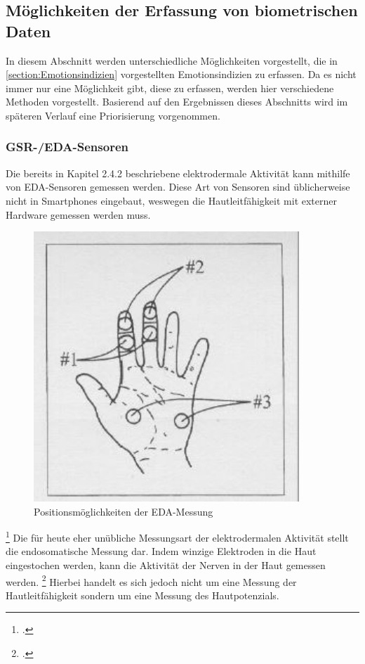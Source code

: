 \subsection{Möglichkeiten der Erfassung von biometrischen Daten} 
In diesem Abschnitt werden unterschiedliche Möglichkeiten vorgestellt, die in \ref{section:Emotionsindizien} vorgestellten Emotionsindizien zu erfassen. Da es nicht immer nur eine Möglichkeit gibt, diese zu erfassen, werden hier verschiedene Methoden vorgestellt. Basierend auf den Ergebnissen dieses Abschnitts wird im späteren Verlauf eine Priorisierung vorgenommen.  
\subsubsection{GSR-/EDA-Sensoren}
Die bereits in Kapitel 2.4.2 beschriebene elektrodermale Aktivität kann mithilfe von EDA-Sensoren gemessen werden. Diese Art von Sensoren sind üblicherweise nicht in Smartphones eingebaut, weswegen die Hautleitfähigkeit mit externer Hardware gemessen werden muss. \newline
\begin{figure}[h]
	\centering
	\includegraphics[width=10cm]{Bilder/gsr-hand.jpg}
	\caption[Positionsmöglichkeiten der EDA-Messung]{Positionsmöglichkeiten der EDA-Messung\footnotemark}
\end{figure}\footcitetext[][Folie 25]{Sch12}
\newline
Die für heute eher unübliche Messungsart der elektrodermalen Aktivität stellt die endosomatische Messung dar. Indem winzige Elektroden in die Haut eingestochen werden, kann die Aktivität der Nerven in der Haut gemessen werden. \footcite[Vgl.][Folie 25]{Sch12} Hierbei handelt es sich jedoch nicht um eine Messung der Hautleitfähigkeit sondern um eine Messung des Hautpotenzials. \newline
